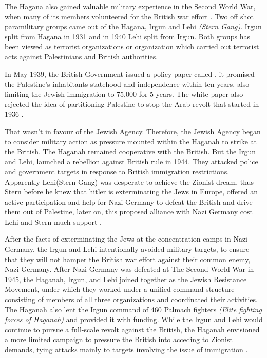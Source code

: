 The Hagana also gained valuable military experience in the Second
World War, when many of its members volunteered for the British war
effort \citep{Pappe2006}. Two off shot paramilitary groups came out of the Hagana, Irgun and Lehi \textit{(Stern Gang)}. Irgun split from Hagana in 1931 and in 1940 Lehi split from Irgun\citep{Shlaim2014}. Both groups has been viewed as terrorist organizations or organization which carried out terrorist acts against Palestinians and British authorities\citep{Bell1976}.   


In May 1939, the British Government issued a policy paper called , it promised the Palestine's inhabitants statehood and independence within ten years, also limiting the Jewish immigration to 75,000 for 5 years. The white paper also rejected the idea of partitioning Palestine to stop the Arab revolt that started in 1936 \citep{Morris2004, Fenby2018}.

That wasn't in favour of the Jewish Agency. Therefore, the Jewish Agency began to consider military action as pressure mounted within the Haganah to strike at the British. The Haganah remained cooperative with the British. But the Irgun and Lehi, launched a rebellion against British rule in 1944. They attacked police and government targets in response to British immigration restrictions. 
Apparently Lehi(Stern Gang) was desperate to achieve the Zionist dream, thus Stern before he knew that hitler is exterminating the Jews in Europe, offered an active participation and help for Nazi Germany to defeat the British and drive them out of Palestine, later on, this proposed alliance with Nazi Germany cost Lehi and Stern much support \citep{Shlaim2014, Heller1995, Grob-Fitzgibbon2011}. 

After the facts of exterminating the Jews at the concentration camps in Nazi Germany, the Irgun and Lehi intentionally avoided military targets, to ensure that they will not hamper the British war effort against their common enemy, Nazi Germany. After Nazi Germany was defeated at The Second World War in 1945, the Haganah, Irgun, and Lehi joined together as the Jewish Resistance Movement, under which they worked under a unified command structure consisting of members of all three organizations and coordinated their activities. The Haganah also lent the Irgun command of 460 Palmach fighters \textit{(Elite fighting forces of Haganah)} and provided it with funding. While the Irgun and Lehi would continue to pursue a full-scale revolt against the British, the Haganah envisioned a more limited campaign to pressure the British into acceding to Zionist demands, tying attacks mainly to targets involving the issue of immigration \citep{Bell1976, Shlaim2014}.


